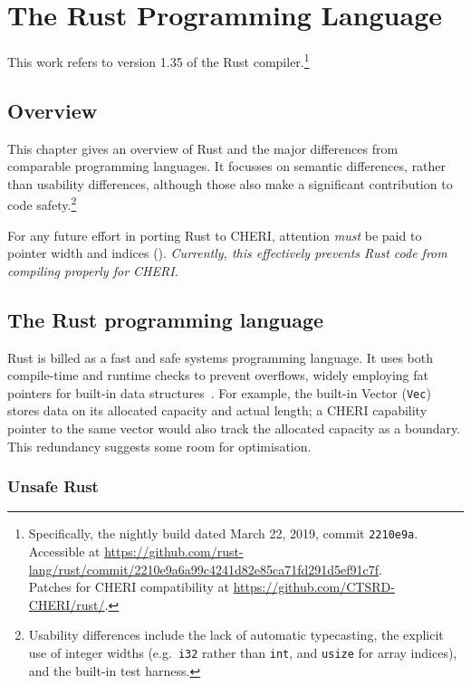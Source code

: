 \documentclass[dissertation.tex]{subfiles}
\begin{document}
\chapter{The Rust Programming Language}
\label{ch:rust}

This work refers to version 1.35 of the Rust
compiler.\footnote{Specifically, the nightly build dated March 22, 2019,
commit \texttt{2210e9a}. \\ Accessible at
\url{https://github.com/rust-lang/rust/commit/2210e9a6a99c4241d82e85ca71fd291d5ef91c7f}.
\\ Patches for CHERI compatibility at \url{https://github.com/CTSRD-CHERI/rust/}.}


\section{Overview}
This chapter gives an overview of Rust and the major differences from
comparable programming languages.
It focusses on semantic differences, rather than usability differences,
although those also make a significant contribution to code
safety.\footnote{Usability differences include the lack of automatic
typecasting, the explicit use of integer widths (e.g.\ \texttt{i32}
rather than \texttt{int}, and \texttt{usize} for array indices), and the
built-in test harness.}

For any future effort in porting Rust to CHERI, attention \emph{must} be
paid to pointer width and indices ().
\emph{Currently, this effectively prevents Rust code from compiling
properly for CHERI.}



\section{The Rust programming language}
Rust is billed as a fast and safe systems programming language.
It uses both compile-time and runtime checks to prevent overflows,
widely employing fat pointers for built-in data
structures~\cite{blandy-orendorff}.
For example, the built-in Vector (\texttt{Vec}) stores data on its
allocated capacity and actual length; a CHERI capability pointer to the
same vector would also track the allocated capacity as a boundary.
This redundancy suggests some room for optimisation.


\subsection{Unsafe Rust}
\label{sec:rust-unsafe}
\end{document}
